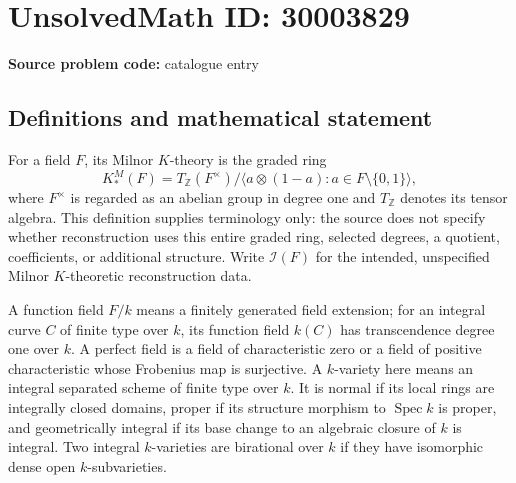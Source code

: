 \documentclass[11pt]{article}
\newcommand{\Z}{\mathbb{Z}}
\begin{document}
\section*{UnsolvedMath ID: 30003829}
\textbf{Source problem code:} catalogue entry
\subsection{Definitions and mathematical statement}
For a field \(F\), its Milnor \(K\)-theory is the graded ring
\[
K_*^M(F)=T_{\Z}(F^\times)\big/\langle a\otimes(1-a):a\in F\setminus\{0,1\}\rangle,
\]
where \(F^\times\) is regarded as an abelian group in degree one and \(T_{\Z}\) denotes its tensor algebra. This definition supplies terminology only: the source does not specify whether reconstruction uses this entire graded ring, selected degrees, a quotient, coefficients, or additional structure. Write \(\mathcal I(F)\) for the intended, unspecified Milnor \(K\)-theoretic reconstruction data.

A function field \(F/k\) means a finitely generated field extension; for an integral curve \(C\) of finite type over \(k\), its function field \(k(C)\) has transcendence degree one over \(k\). A perfect field is a field of characteristic zero or a field of positive characteristic whose Frobenius map is surjective. A \(k\)-variety here means an integral separated scheme of finite type over \(k\). It is normal if its local rings are integrally closed domains, proper if its structure morphism to \(\operatorname{Spec}k\) is proper, and geometrically integral if its base change to an algebraic closure of \(k\) is integral. Two integral \(k\)-varieties are birational over \(k\) if they have isomorphic dense open \(k\)-subvarieties.
\end{document}
